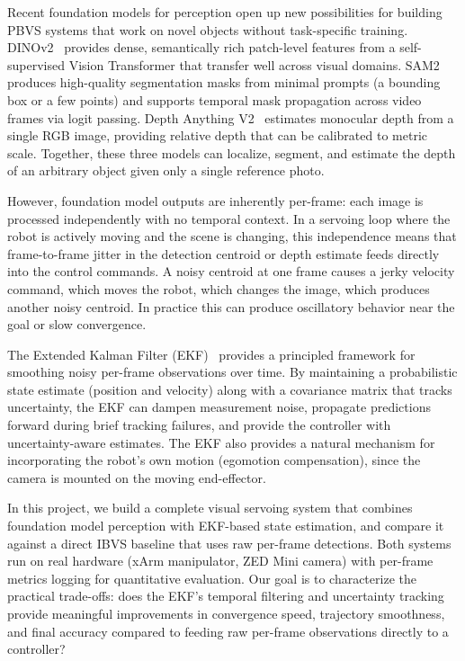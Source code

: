 \documentclass[letterpaper, 10 pt, conference]{ieeeconf}  %
\begin{document}
Recent foundation models for perception open up new possibilities for building PBVS systems that work on novel objects without task-specific training. DINOv2~\cite{dinov2} provides dense, semantically rich patch-level features from a self-supervised Vision Transformer that transfer well across visual domains. SAM2~\cite{sam2} produces high-quality segmentation masks from minimal prompts (a bounding box or a few points) and supports temporal mask propagation across video frames via logit passing. Depth Anything V2~\cite{depthanything} estimates monocular depth from a single RGB image, providing relative depth that can be calibrated to metric scale. Together, these three models can localize, segment, and estimate the depth of an arbitrary object given only a single reference photo.

However, foundation model outputs are inherently per-frame: each image is processed independently with no temporal context. In a servoing loop where the robot is actively moving and the scene is changing, this independence means that frame-to-frame jitter in the detection centroid or depth estimate feeds directly into the control commands. A noisy centroid at one frame causes a jerky velocity command, which moves the robot, which changes the image, which produces another noisy centroid. In practice this can produce oscillatory behavior near the goal or slow convergence.

The Extended Kalman Filter (EKF)~\cite{thrun2005} provides a principled framework for smoothing noisy per-frame observations over time. By maintaining a probabilistic state estimate (position and velocity) along with a covariance matrix that tracks uncertainty, the EKF can dampen measurement noise, propagate predictions forward during brief tracking failures, and provide the controller with uncertainty-aware estimates. The EKF also provides a natural mechanism for incorporating the robot's own motion (egomotion compensation), since the camera is mounted on the moving end-effector.

In this project, we build a complete visual servoing system that combines foundation model perception with EKF-based state estimation, and compare it against a direct IBVS baseline that uses raw per-frame detections. Both systems run on real hardware (xArm manipulator, ZED Mini camera) with per-frame metrics logging for quantitative evaluation. Our goal is to characterize the practical trade-offs: does the EKF's temporal filtering and uncertainty tracking provide meaningful improvements in convergence speed, trajectory smoothness, and final accuracy compared to feeding raw per-frame observations directly to a controller?
\end{document}
